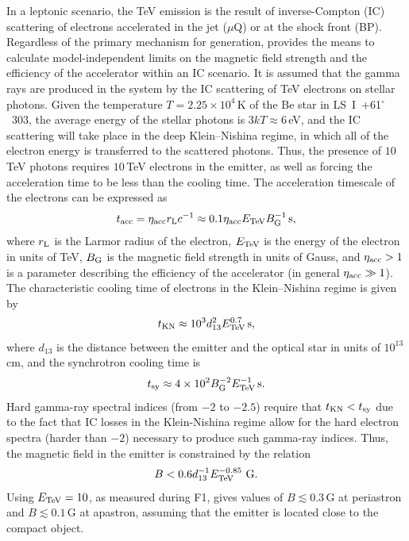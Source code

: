 \documentclass[preprint2]{aastex}
\newcommand{\tapp}{\raisebox{0.5ex}{\texttildelow}}
\newcommand{\lsi}{LS~I~+61$^{\circ}$~303}
\newcommand{\tev}{\,TeV}
\begin{document}
 In a leptonic scenario, the TeV emission is the result of inverse-Compton (IC) scattering of electrons accelerated in the jet ($\mu$Q) or at the shock front (BP). Regardless of the primary mechanism for generation, \citet{2008MNRAS.383..467K} provides the means to calculate model-independent limits on the magnetic field strength and the efficiency of the accelerator within an IC scenario. It is assumed that the gamma rays are produced in the system by the IC scattering of TeV electrons on stellar photons. Given the temperature $T=2.25\times10^4$\,K \citep{2013A&ARv..21...64D} of the Be star in \lsi{}, the average energy of the stellar photons is $3kT \approx 6$\,eV, and the IC scattering will take place in the deep Klein--Nishina regime, in which all of the electron energy is transferred to the scattered photons. Thus, the presence of \tapp{}$10$\tev{} photons requires \tapp{}$10$\tev{} electrons in the emitter, as well as forcing the acceleration time to be less than the cooling time. The acceleration timescale of the electrons can be expressed as
\begin{equation}
t_{\mbox{\scriptsize{acc}}} = \eta_{\mbox{\scriptsize{acc}}} r_{\mbox{\scriptsize{L}}} c^{-1} \approx 0.1 \eta_{\mbox{\scriptsize{acc}}} E_{\mbox{\scriptsize{TeV}}} B_{\mbox{\scriptsize{G}}}^{-1} \mbox{\,s},
\label{taccel}
\end{equation}
where $r_{\mbox{\scriptsize{L}}}$ is the Larmor radius of the electron, $E_{\mbox{\scriptsize{TeV}}}$ is the energy of the electron in units of TeV, $B_{\mbox{\scriptsize{G}}}$ is the magnetic field strength in units of Gauss, and $\eta_{\mbox{\scriptsize{acc}}} > 1$ is a parameter describing the efficiency of the accelerator (in general $\eta_{\mbox{\scriptsize{acc}}} \gg 1$). The characteristic cooling time of electrons in the Klein--Nishina regime is given by
\begin{equation}
t_{\mbox{\scriptsize{KN}}} \approx 10^3 d_{13}^2 E_{\mbox{\scriptsize{TeV}}}^{0.7} \mbox{\,s},
\end{equation}
where $d_{13}$ is the distance between the emitter and the optical star in units of $10^{13}$\,cm, and the synchrotron cooling time is 
\begin{equation}
t_{\mbox{\scriptsize{sy}}} \approx 4\times10^2 B_{\mbox{\scriptsize{G}}}^{-2} E_{\mbox{\scriptsize{TeV}}}^{-1} \mbox{\,s}.
\end{equation}
Hard gamma-ray spectral indices (from $-2$ to $-2.5$) require that $t_{\mbox{\scriptsize{KN}}} < t_{\mbox{\scriptsize{sy}}}$ due to the fact that IC losses in the Klein-Nishina regime allow for the hard electron spectra (harder than $-2$) necessary to produce such gamma-ray indices. Thus, the magnetic field in the emitter is constrained by the relation
\begin{equation}
{B < 0.6 d_{13}^{-1} E_{\mbox{\scriptsize{TeV}}}^{-0.85} \,\mbox{\,G}}.
\end{equation}
Using $ E_{\mbox{\scriptsize{TeV}}} = 10$, as measured during F1, gives values of $B \lesssim 0.3$\,G at periastron and $B \lesssim 0.1$\,G at apastron, assuming that the emitter is located close to the compact object.
\end{document}
